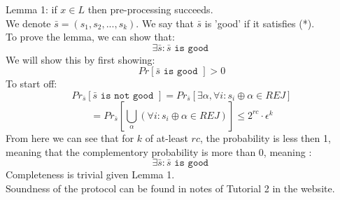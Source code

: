 Lemma 1:
if $x\in L$ then pre-processing succeeds.\\
We denote $\bar{s}=(s_1,s_2,...,s_k)$. We say that $\bar{s}$ is 'good' if it satisfies (*).\\
To prove the lemma, we can show that:
\[
    \exists \bar{s}:\bar{s}\texttt{ is good }
\]
We will show this by first showing:
\[
    Pr[\bar{s}\texttt{ is good }]>0
\]
To start off:
\[
    Pr_{\bar{s}}[\bar{s}\texttt{ is not good }]
    =Pr_{\bar{s}}[\exists\alpha, \forall i:s_i\oplus\alpha\in REJ]
\]\[
    =Pr_{\bar{s}}[\bigcup_\alpha\left(\forall i: s_i\oplus\alpha\in REJ\right)]
\leq 2^{rc}\cdot \epsilon^k
\]
From here we can see that for $k$ of at-least $rc$, the probability is less then 1, meaning that the complementory probability is more than 0, meaning :
\[
    \exists \bar{s}:\bar{s}\texttt{ is good }
\]
Completeness is trivial given Lemma 1.\\
Soundness of the protocol can be found in notes of Tutorial 2 in the website.

